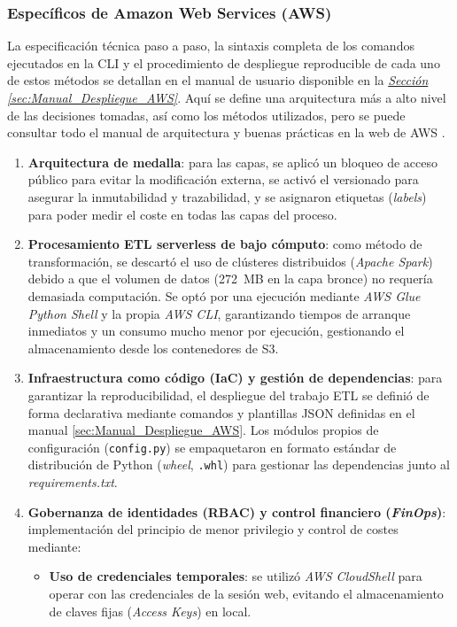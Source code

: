 \subsubsection{Específicos de Amazon Web Services (AWS)}

La especificación técnica paso a paso, la sintaxis completa de los comandos ejecutados en la CLI y el procedimiento de despliegue reproducible de cada uno de estos métodos se detallan en el manual de usuario disponible en la \hyperref[sec:Manual_Despliegue_AWS]{\textit{Sección \ref*{sec:Manual_Despliegue_AWS}}}. Aquí se define una arquitectura más a alto nivel de las decisiones tomadas, así como los métodos utilizados, pero se puede consultar todo el manual de arquitectura y buenas prácticas en la web de AWS \citep{AWSWellArchitected2026}.

\begin{enumerate}
	\item \textbf{Arquitectura de medalla}: para las capas, se aplicó un bloqueo de acceso público para evitar la modificación externa, se activó el versionado para asegurar la inmutabilidad y trazabilidad, y se asignaron etiquetas (\textit{labels}) para poder medir el coste en todas las capas del proceso.
	\item \textbf{Procesamiento ETL serverless de bajo cómputo}: como método de transformación, se descartó el uso de clústeres distribuidos (\textit{Apache Spark}) debido a que el volumen de datos (272~MB en la capa bronce) no requería demasiada computación. Se optó por una ejecución mediante \textit{AWS Glue Python Shell} y la propia \textit{AWS CLI}, garantizando tiempos de arranque inmediatos y un consumo mucho menor por ejecución, gestionando el almacenamiento desde los contenedores de S3.
	\item \textbf{Infraestructura como código (IaC) y gestión de dependencias}: para garantizar la reproducibilidad, el despliegue del trabajo ETL se definió de forma declarativa mediante comandos y plantillas JSON definidas en el manual \ref{sec:Manual_Despliegue_AWS}. Los módulos propios de configuración (\texttt{config.py}) se empaquetaron en formato estándar de distribución de Python (\textit{wheel}, \texttt{.whl}) para gestionar las dependencias junto al \textit{requirements.txt}.
	\item \textbf{Gobernanza de identidades (RBAC) y control financiero (\textit{FinOps})}: implementación del principio de menor privilegio y control de costes mediante:
	\begin{itemize}
		\item \textbf{Uso de credenciales temporales}: se utilizó \textit{AWS CloudShell} para operar con las credenciales de la sesión web, evitando el almacenamiento de claves fijas (\textit{Access Keys}) en local.

\end{itemize}
\end{enumerate}
